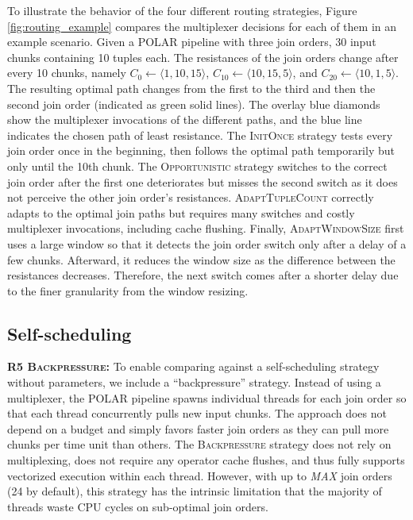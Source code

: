\begin{example2} To illustrate the behavior of the four different routing strategies, Figure \ref{fig:routing_example} compares the multiplexer decisions for each of them in an example scenario. Given a POLAR pipeline with three join orders, 30 input chunks containing 10 tuples each. The resistances of the join orders change after every 10 chunks, namely $C_0 \gets \langle 1, 10, 15 \rangle$, $C_{10} \gets \langle 10, 15, 5 \rangle$, and $C_{20} \gets \langle 10, 1, 5 \rangle$. The resulting optimal path changes from the first to the third and then the second join order (indicated as green solid lines). The overlay blue diamonds show the multiplexer invocations of the different paths, and the blue line indicates the chosen path of least resistance. The \textsc{InitOnce} strategy tests every join order once in the beginning, then follows the optimal path temporarily but only until the 10th chunk. The \textsc{Opportunistic} strategy switches to the correct join order after the first one deteriorates but misses the second switch as it does not perceive the other join order's resistances. \textsc{AdaptTupleCount} correctly adapts to the optimal join paths but requires many switches and costly multiplexer invocations, including cache flushing. Finally, \textsc{AdaptWindowSize} first uses a large window so that it detects the join order switch only after a delay of a few chunks. Afterward, it reduces the window size as the difference between the resistances decreases. Therefore, the next switch comes after a shorter delay due to the finer granularity from the window resizing.
\end{example2}

\subsection{Self-scheduling}\label{sec:backpressure}

\textbf{R5 \textsc{Backpressure}:} To enable comparing against a self-scheduling strategy without parameters, we include a \enquote{backpressure} strategy. Instead of using a multiplexer, the POLAR pipeline spawns individual threads for each join order so that each thread concurrently pulls new input chunks. The approach does not depend on a budget and simply favors faster join orders as they can pull more chunks per time unit than others. The \textsc{Backpressure} strategy does not rely on multiplexing, does not require any operator cache flushes, and thus fully supports vectorized execution within each thread. However, with up to \textit{MAX} join orders (24 by default), this strategy has the intrinsic limitation that the majority of threads waste CPU cycles on sub-optimal join orders. 

